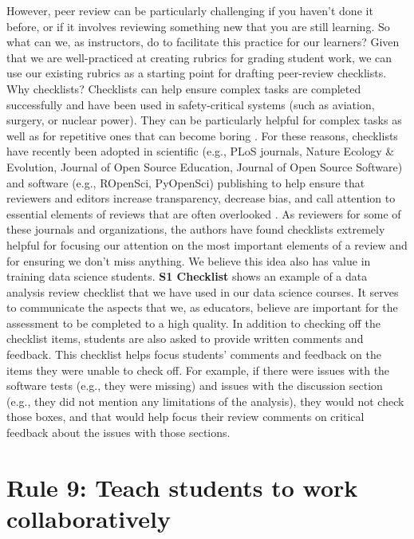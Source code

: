 \documentclass[
  10pt,
  letterpaper,
]{article}
\begin{document}
However, peer review can be particularly challenging if you haven't done
it before, or if it involves reviewing something new that you are still
learning. So what can we, as instructors, do to facilitate this practice
for our learners? Given that we are well-practiced at creating rubrics
for grading student work, we can use our existing rubrics as a starting
point for drafting peer-review checklists. Why checklists? Checklists
can help ensure complex tasks are completed successfully and have been
used in safety-critical systems (such as aviation, surgery, or nuclear
power). They can be particularly helpful for complex tasks as well as
for repetitive ones that can become boring \citep{gawande2010checklist}.
For these reasons, checklists have recently been adopted in scientific
(e.g., PLoS journals, Nature Ecology \& Evolution, Journal of Open
Source Education, Journal of Open Source Software) and software (e.g.,
ROpenSci, PyOpenSci) publishing to help ensure that reviewers and
editors increase transparency, decrease bias, and call attention to
essential elements of reviews that are often overlooked
\citep{parker2018empowering}. As reviewers for some of these journals
and organizations, the authors have found checklists extremely helpful
for focusing our attention on the most important elements of a review
and for ensuring we don't miss anything. We believe this idea also has
value in training data science students. \textbf{S1 Checklist} shows an
example of a data analysis review checklist that we have used in our
data science courses. It serves to communicate the aspects that we, as
educators, believe are important for the assessment to be completed to a
high quality. In addition to checking off the checklist items, students
are also asked to provide written comments and feedback. This checklist
helps focus students' comments and feedback on the items they were
unable to check off. For example, if there were issues with the software
tests (e.g., they were missing) and issues with the discussion section
(e.g., they did not mention any limitations of the analysis), they would
not check those boxes, and that would help focus their review comments
on critical feedback about the issues with those sections.

\section{Rule 9: Teach students to work
collaboratively}\label{sec-rule9}
\end{document}
